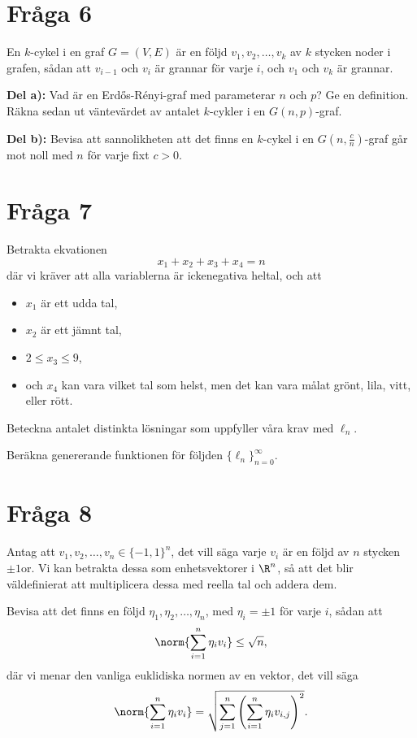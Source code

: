 \documentclass[nobib]{tufte-handout}
\begin{document}
\section{Fråga 6} %

En $k$-cykel i en graf $G = (V,E)$ är en följd $v_1, v_2, \ldots, v_k$ av $k$ stycken noder i grafen, sådan att $v_{i-1}$ och $v_i$ är grannar för varje $i$, och $v_1$ och $v_k$ är grannar.

\textbf{Del a):} Vad är en Erd\H{o}s-Rényi-graf med parameterar $n$ och $p$? Ge en definition. Räkna sedan ut väntevärdet av antalet $k$-cykler i en $G(n,p)$-graf.

\noindent\textbf{Del b):} Bevisa att sannolikheten att det finns en $k$-cykel i en $G\left(n, \frac{c}{n}\right)$-graf går mot noll med $n$ för varje fixt $c > 0$.

\section{Fråga 7} %

Betrakta ekvationen
$$x_1 + x_2 + x_3 + x_4 = n$$
där vi kräver att alla variablerna är ickenegativa heltal, och att
\begin{itemize}
  \item $x_1$ är ett udda tal,
  \item $x_2$ är ett jämnt tal,
  \item $2 \leq x_3 \leq 9$,
  \item och $x_4$ kan vara vilket tal som helst, men det kan vara målat grönt, lila, vitt, eller rött.
\end{itemize}

Beteckna antalet distinkta lösningar som uppfyller våra krav med $\ell_n$.

Beräkna genererande funktionen för följden $\{\ell_n\}_{n=0}^\infty$.

\section{Fråga 8} %

Antag att $v_1, v_2, \ldots, v_n \in \{-1,1\}^n$, det vill säga varje $v_i$ är en följd av $n$ stycken $\pm 1$or. Vi kan betrakta dessa som enhetsvektorer i $\R^n$, så att det blir väldefinierat att multiplicera dessa med reella tal och addera dem.

Bevisa att det finns en följd $\eta_1, \eta_2, \ldots, \eta_n$, med $\eta_i = \pm 1$ för varje $i$, sådan att
$$\norm{\sum_{i=1}^{n} \eta_i v_i} \leq \sqrt{n},$$
där vi menar den vanliga euklidiska normen av en vektor, det vill säga
$$\norm{\sum_{i=1}^{n} \eta_i v_i} = \sqrt{\sum_{j=1}^{n} \left(\sum_{i=1}^{n} \eta_{i}v_{i,j}\right)^2}.$$
\end{document}
